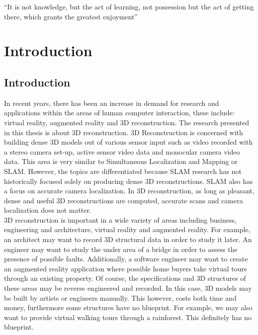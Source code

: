 \begin{savequote}[8cm]
  ``It is not knowledge, but the act of learning, not possession but the act of getting there, which grants the greatest enjoyment''
\end{savequote}
\makeatletter
\chapter{Introduction}



\section{Introduction}

In recent years, there has been an increase in demand for research and applications within the areas of human computer interaction, these include: virtual reality, augmented reality and 3D reconstruction. The research presented in this thesis is about 3D reconstruction. 3D Reconstruction is concerned with building dense 3D models out of various sensor input such as video recorded with a stereo camera set-up, active sensor video data and monocular camera video data. This area is very similar to Simultaneous Localization and Mapping or SLAM. However, the topics are differentiated because SLAM research has not historically focused solely on producing dense 3D reconstructions. SLAM also has a focus on accurate camera localization. In 3D reconstruction, as long as pleasant, dense and useful 3D reconstructions are computed, accurate scans and camera localization does not matter. \\

3D reconstruction is important in a wide variety of areas including business, engineering and architecture, virtual reality and augmented reality. For example, an architect may want to record 3D structural data in order to study it later. An engineer may want to study the under area of a bridge in order to assess the presence of possible faults. Additionally, a software engineer may want to create an augmented reality application where possible home buyers take virtual tours through an existing property. Of course, the specifications and 3D structures of these areas may be reverse engineered and recorded. In this case, 3D models may be built by artists or engineers manually. This however, costs both time and money, furthermore some structures have no blueprint. For example, we may also want to provide virtual walking tours through a rainforest. This definitely has no blueprint. \\

